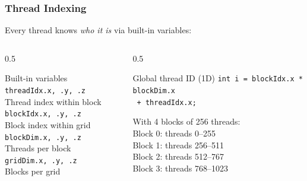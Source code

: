 \documentclass[aspectratio=169]{beamer}
\begin{document}
\begin{frame}
	\frametitle{Thread Indexing}
	Every thread knows \textit{who it is} via built-in variables:
	\vspace{0.5em}
	\begin{columns}
		\begin{column}{0.5\textwidth}
			\begin{block}{Built-in variables}
				\texttt{threadIdx.x, .y, .z} \\
				\quad Thread index within block \\[0.5em]
				\texttt{blockIdx.x, .y, .z} \\
				\quad Block index within grid \\[0.5em]
				\texttt{blockDim.x, .y, .z} \\
				\quad Threads per block \\[0.5em]
				\texttt{gridDim.x, .y, .z} \\
				\quad Blocks per grid
			\end{block}
		\end{column}
		\begin{column}{0.5\textwidth}
			\begin{block}{Global thread ID (1D)}
				\texttt{int i = blockIdx.x * blockDim.x} \\
				\texttt{\hspace{2.5em}  + threadIdx.x;}
				\vspace{0.5em}

				With 4 blocks of 256 threads: \\
				Block 0: threads 0--255 \\
				Block 1: threads 256--511 \\
				Block 2: threads 512--767 \\
				Block 3: threads 768--1023
			\end{block}
		\end{column}
	\end{columns}
\end{frame}
\end{document}
